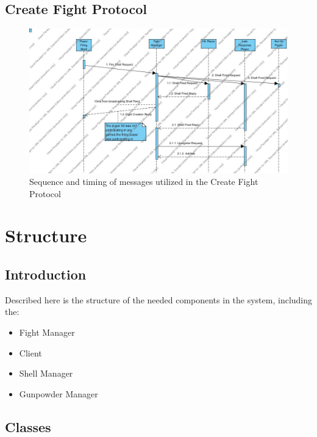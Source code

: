 \documentclass[12pt]{article}
\begin{document}
	\subsection{Create Fight Protocol}
		\begin{center}
			\begin{figure}[htp]
				\centering
				\includegraphics[width=\textwidth]{Diagrams/Sequence Diagrams/Create Fight Protocol Sequence.jpg}
				\caption{Sequence and timing of messages utilized in the Create Fight Protocol}
			\end{figure}
		\end{center}
	\newpage
	\section{Structure}
		\subsection{Introduction}
			Described here is the structure of the needed components in the system, including the:
				\begin{itemize}
					\item{Fight Manager}
					\item{Client}
					\item{Shell Manager}
					\item{Gunpowder Manager}
				\end{itemize}
		\subsection{Classes}
\end{document}
